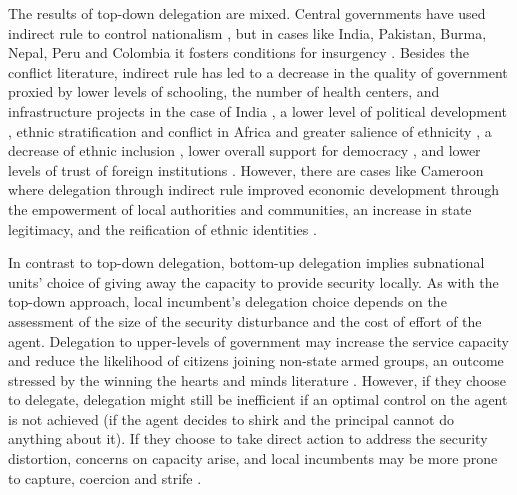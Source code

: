 \documentclass[12pt]{amsart}
\numberwithin{equation}{section}
\theoremstyle{definition}
\theoremstyle{definition}
\theoremstyle{definition}
\begin{document}
The results of top-down delegation are mixed. Central governments have used indirect rule to control nationalism \citep{siroky_2021}, but in cases like India, Pakistan, Burma, Nepal, Peru and Colombia it fosters conditions for insurgency \citep{Mukherjee_2018}. Besides the conflict literature, indirect rule has led to a decrease in the quality of government proxied by lower levels of schooling, the number of health centers, and infrastructure projects in the case of India \citep{lyer_2010}, a lower level of political development \citep{lange_2004}, ethnic stratification and conflict in Africa \citep{Blanton_etal_2001} and greater salience of ethnicity \citep{Mcnamee_2019}, a decrease of ethnic inclusion \citep{mcalexander_2020}, lower overall support for democracy \citep{lechler_2018}, and lower levels of trust of foreign institutions \citep{Okoye_2021}. However, there are cases like Cameroon where delegation through indirect rule improved economic development through the empowerment of local authorities and communities, an increase in state legitimacy, and the reification of ethnic identities \citep{letsa_2020}.                       

In contrast to top-down delegation, bottom-up delegation implies subnational units’ choice of giving away the capacity to provide security locally. As with the top-down approach, local incumbent’s delegation choice depends on the assessment of the size of the security disturbance and the cost of effort of the agent. Delegation to upper-levels of government may increase the service capacity and reduce the likelihood of citizens joining non-state armed groups, an outcome stressed by the winning the hearts and minds literature \citep{beath_etal_2013, berman_etal_2011, dell_querubin_2018}. However, if they choose to delegate, delegation might still be inefficient if an optimal control on the agent is not achieved (if the agent decides to shirk and the principal cannot do anything about it). If they choose to take direct action to address the security distortion, concerns on capacity arise, and local incumbents may be more prone to capture, coercion and strife \citet{chacon_2018}.

\end{document}
